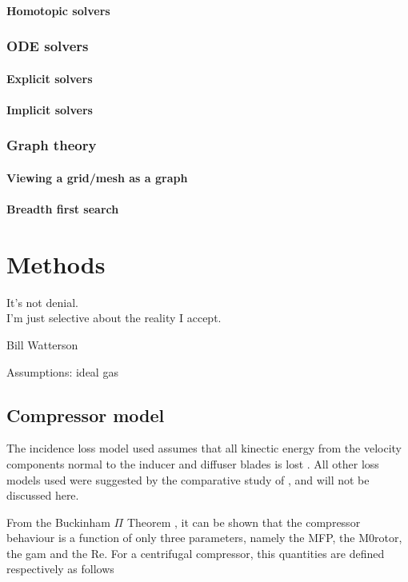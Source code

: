 \documentclass[tcc]{subfiles}
\begin{document}
\subsubsection{Homotopic solvers}
\subsection{\ac{ODE} solvers}
\subsubsection{Explicit solvers}
\subsubsection{Implicit solvers}
\subsection{Graph theory}
\subsubsection{Viewing a grid/mesh as a graph}
\subsubsection{Breadth first search}

\chapter{Methods}
\label{sec:methods}
\epigraph{It's not denial. \\ I'm just selective about the reality I accept.}{Bill Watterson}
Assumptions: ideal gas
\section{Compressor model}

The incidence loss model used assumes that all kinectic energy from the velocity components
normal to the inducer and diffuser blades is lost \cite{Stanitz1953}.
All other loss models used were suggested by the comparative study of \textcite{Oh1997}, 
and will not be discussed here.



From the Buckinham $\Pi$ Theorem \cite{Buckingham1914}, 
it can be shown that the compressor behaviour is a function of only three parameters, 
namely the \acl{MFP}, the \acl{M0rotor}, the \acl{gam} and the \acl{Re}. 
For a centrifugal compressor, this quantities are defined respectively as follows
\end{document}

